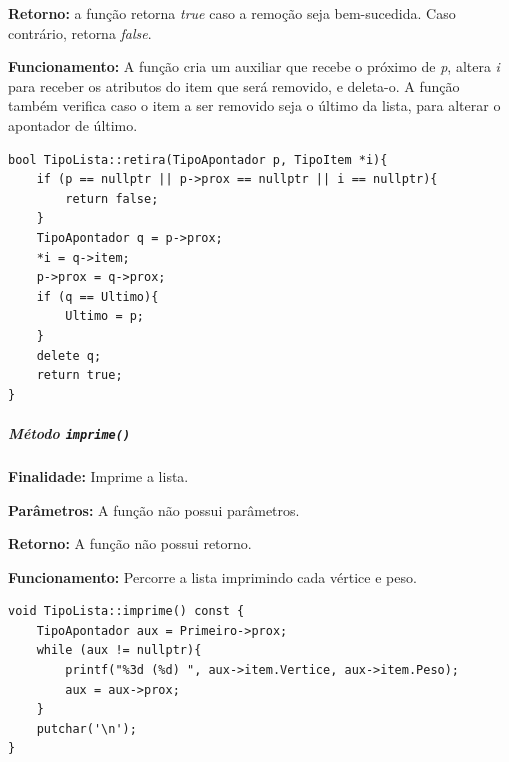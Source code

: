 \documentclass{article}
\begin{document}
    \textbf{Retorno:} a função retorna \textit{true} caso a remoção seja bem-sucedida. Caso contrário, retorna \textit{false}.

    \textbf{Funcionamento:} A função cria um auxiliar que recebe o próximo de \textit{p}, altera \textit{i} para receber os atributos do item que será removido, e deleta-o. A função também verifica caso o item a ser removido seja o último da lista, para alterar o apontador de último.

\begin{verbatim}
bool TipoLista::retira(TipoApontador p, TipoItem *i){
    if (p == nullptr || p->prox == nullptr || i == nullptr){
        return false;
    }
    TipoApontador q = p->prox;
    *i = q->item;
    p->prox = q->prox;
    if (q == Ultimo){
        Ultimo = p;
    }
    delete q;
    return true;
}
\end{verbatim}





\subparagraph{Método \texttt{imprime()}}

    \mbox{}\par
    \noindent
    \textbf{Finalidade:} Imprime a lista.

    \textbf{Parâmetros:} A função não possui parâmetros.

    \textbf{Retorno:} A função não possui retorno.

    \textbf{Funcionamento:} Percorre a lista imprimindo cada vértice e peso.

\begin{verbatim}
void TipoLista::imprime() const {
    TipoApontador aux = Primeiro->prox;
    while (aux != nullptr){
        printf("%3d (%d) ", aux->item.Vertice, aux->item.Peso);
        aux = aux->prox;
    }
    putchar('\n');
}
\end{verbatim}










\end{document}
